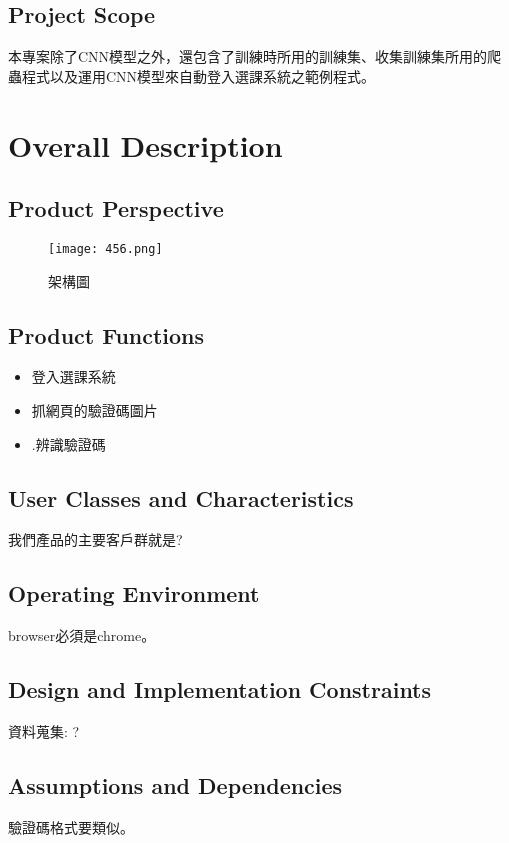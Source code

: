 \documentclass{scrreprt}
\begin{document}
\begin{CJK}{UTF8}{nkai}
\section{Project Scope}
\setlength{\parindent}{1.5em}本專案除了CNN模型之外，還包含了訓練時所用的訓練集、收集訓練集所用的爬蟲程式以及運用CNN模型來自動登入選課系統之範例程式。

\chapter{Overall Description}

\section{Product Perspective}

\begin{figure}[h]
\begin{center}
\texttt{[image: 456.png]}
\end{center}
\caption{架構圖}
\label{fig:1}
\end{figure}

\section{Product Functions}

\begin{itemize}
  \item  登入選課系統
  \item 抓網頁的驗證碼圖片
  \item .辨識驗證碼
\end{itemize}

\section{User Classes and Characteristics}
我們產品的主要客戶群就是?

\section{Operating Environment}
browser必須是chrome。
\section{Design and Implementation Constraints}
\setlength{\parindent}{1.5em}資料蒐集: ?
\section{Assumptions and Dependencies}
\setlength{\parindent}{1.5em}驗證碼格式要類似。


\end{CJK}
\end{document}
